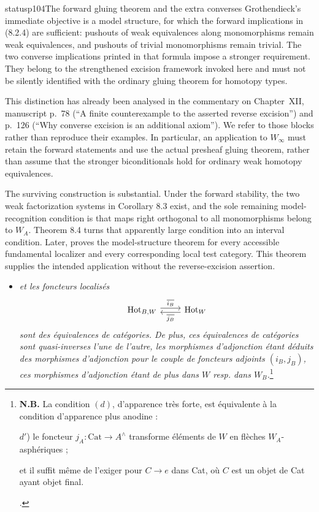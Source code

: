 \begin{dcomment}{status}{p104}{The forward gluing theorem and the extra converses}
Grothendieck's immediate objective is a model structure, for which the forward implications in (8.2.4) are sufficient: pushouts of weak equivalences along monomorphisms remain weak equivalences, and pushouts of trivial monomorphisms remain trivial. The two converse implications printed in that formula impose a stronger requirement. They belong to the strengthened excision framework invoked here and must not be silently identified with the ordinary gluing theorem for homotopy types.

This distinction has already been analysed in the commentary on Chapter~XII, manuscript p.~78 (``A finite counterexample to the asserted reverse excision'') and p.~126 (``Why converse excision is an additional axiom''). We refer to those blocks rather than reproduce their examples. In particular, an application to $W_\infty$ must retain the forward statements and use the actual presheaf gluing theorem, rather than assume that the stronger biconditionals hold for ordinary weak homotopy equivalences.

The surviving construction is substantial. Under the forward stability, the two weak factorization systems in Corollary 8.3 exist, and the sole remaining model-recognition condition is that maps right orthogonal to all monomorphisms belong to $W_A$. Theorem 8.4 turns that apparently large condition into an interval condition. Later, \citet[Corollary 4.2.18]{Cisinski2006} proves the model-structure theorem for every accessible fundamental localizer and every corresponding local test category. This theorem supplies the intended application without the reverse-excision assertion.
\end{dcomment}



\begin{itemize}[label={},leftmargin=4.5em]
\item \textit{et les foncteurs localisés}
\[
\begin{tikzcd}
\mathrm{Hot}_{B,W} \arrow[r, shift left, "\overline{i_B}"] & \mathrm{Hot}_W \arrow[l, shift left, "\overline{j_B}"]
\end{tikzcd}
\]
\textit{sont des équivalences de catégories. De plus, ces équivalences de catégories sont quasi-inverses l'une de l'autre, les morphismes d'adjonction étant déduits des morphismes d'adjonction pour le couple de foncteurs adjoints $(i_B, j_B)$, ces morphismes d'adjonction étant de plus dans $W$ resp. dans $W_B$.}\footnote[38]{\textbf{N.B.} La condition $(d)$, d'apparence très forte, est équivalente à la condition d'apparence plus anodine :\par
$d'$) le foncteur $j_A : \mathrm{Cat} \longrightarrow A^\wedge$ transforme éléments de $W$ en flèches $W_A$-asphériques ;\par\noindent
et il suffit même de l'exiger pour $C \longrightarrow e$ dans Cat, où $C$ est un objet de Cat ayant objet final.\par\noindent
.}
\end{itemize}

